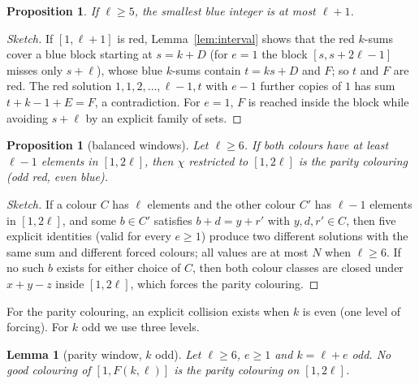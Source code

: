 \documentclass[11pt]{amsart}
\newtheorem{lemma}[theorem]{Lemma}
\newtheorem{proposition}[theorem]{Proposition}
\theoremstyle{definition}
\newcommand{\F}{F}
\begin{document}
\begin{proposition}\label{prop:smallblue}
If $\ell\ge5$, the smallest blue integer is at most $\ell+1$.
\end{proposition}

\begin{proof}[Sketch]
If $[1,\ell+1]$ is red, Lemma~\ref{lem:interval} shows that the red $k$-sums cover a blue block starting at $s=k+D$ (for $e=1$ the block $[s,s+2\ell-1]$ misses only $s+\ell$), whose blue $k$-sums contain $t=ks+D$ and $\F$; so $t$ and $\F$ are red. The red solution $1,1,2,\dots,\ell-1,t$ with $e-1$ further copies of $1$ has sum $t+k-1+E=\F$, a contradiction. For $e=1$, $\F$ is reached inside the block while avoiding $s+\ell$ by an explicit family of sets.
\end{proof}

\begin{proposition}[balanced windows]\label{prop:balanced}
Let $\ell\ge6$. If both colours have at least $\ell-1$ elements in $[1,2\ell]$, then $\chi$ restricted to $[1,2\ell]$ is the parity colouring (odd red, even blue).
\end{proposition}

\begin{proof}[Sketch]
If a colour $C$ has $\ell$ elements and the other colour $C'$ has $\ell-1$ elements in $[1,2\ell]$, and some $b\in C'$ satisfies $b+d=y+r'$ with $y,d,r'\in C$, then five explicit identities (valid for every $e\ge1$) produce two different solutions with the same sum and different forced colours; all values are at most $N$ when $\ell\ge6$. If no such $b$ exists for either choice of $C$, then both colour classes are closed under $x+y-z$ inside $[1,2\ell]$, which forces the parity colouring.
\end{proof}

\noindent For the parity colouring, an explicit collision exists when $k$ is even (one level of forcing). For $k$ odd we use three levels.

\begin{lemma}[parity window, $k$ odd]\label{lem:parityodd}
Let $\ell\ge6$, $e\ge1$ and $k=\ell+e$ odd. No good colouring of $[1,\F(k,\ell)]$ is the parity colouring on $[1,2\ell]$.
\end{lemma}
\end{document}
